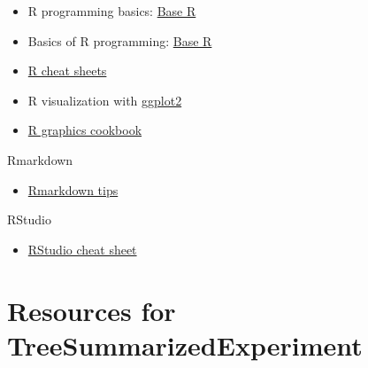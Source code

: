 \documentclass[
  oneside]{book}
\providecommand{\tightlist}{%
  \setlength{\itemsep}{0pt}\setlength{\parskip}{0pt}}
\begin{document}
\begin{itemize}
\tightlist
\item
  R programming basics: \href{https://www.rstudio.com/wp-content/uploads/2016/10/r-cheat-sheet-3.pdf}{Base R}
\item
  Basics of R programming: \href{https://raw.githubusercontent.com/rstudio/cheatsheets/master/base-r.pdf}{Base R}
\item
  \href{https://www.rstudio.com/resources/cheatsheets/}{R cheat sheets}
\item
  R visualization with \href{https://www.rstudio.com/wp-content/uploads/2016/11/ggplot2-cheatsheet-2.1.pdf}{ggplot2}
\item
  \href{http://www.cookbook-r.com/Graphs/}{R graphics cookbook}
\end{itemize}

Rmarkdown

\begin{itemize}
\tightlist
\item
  \href{https://rmarkdown.rstudio.com/}{Rmarkdown tips}
\end{itemize}

RStudio

\begin{itemize}
\tightlist
\item
  \href{https://www.rstudio.com/wp-content/uploads/2016/01/rstudio-IDE-cheatsheet.pdf}{RStudio cheat sheet}
\end{itemize}

\hypertarget{resources-for-treesummarizedexperiment}{%
\section{Resources for TreeSummarizedExperiment}\label{resources-for-treesummarizedexperiment}}
\end{document}

